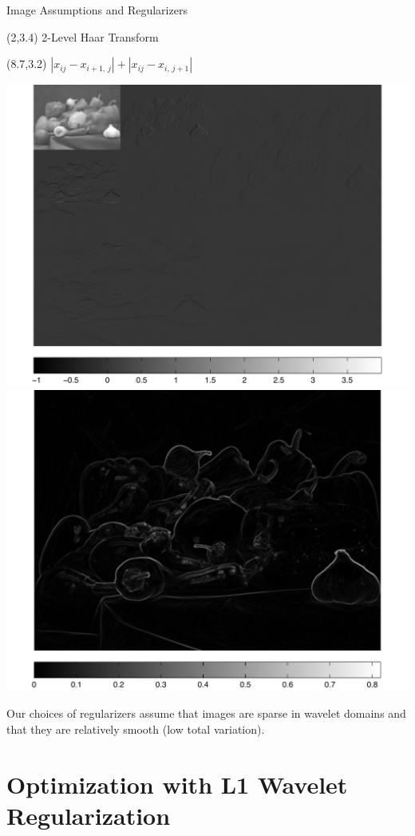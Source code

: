 \documentclass[12pt]{beamer}
\begin{document}
\begin{frame}{Image Assumptions and Regularizers}

\begin{textblock}{6}(2,3.4)
2-Level Haar Transform
\end{textblock}

\begin{textblock}{6}(8.7,3.2)
$|x_{ij} - x_{i+1,\,j}| + |x_{ij}-x_{i,\,j+1}|$ 
\end{textblock}

\begin{center}
\includegraphics[width=0.5\linewidth]{../figures/haarTrans.pdf} \hspace{-1em}
\includegraphics[width=0.5\linewidth]{../figures/diff.pdf}
\end{center}

Our choices of regularizers assume that images are sparse in wavelet domains and that they are relatively smooth (low total variation).



\end{frame}

\section{Optimization with L1 Wavelet Regularization}
\end{document}
